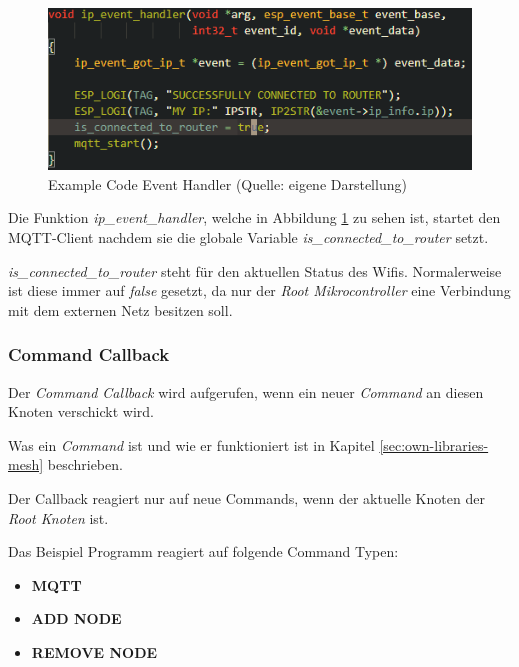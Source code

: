 \begin{figure}[H]
    \begin{center}
        \includegraphics[scale=0.8]{images/example_code_event_handler.png}
        \caption{Example Code Event Handler (Quelle: eigene Darstellung)}
        \label{abb:example_code_event_handler}
    \end{center}
\end{figure}

Die Funktion \textit{ip\_event\_handler}, welche in Abbildung \ref{abb:example_code_event_handler} zu sehen ist, startet den MQTT-Client nachdem sie die globale Variable \textit{is\_connected\_to\_router} setzt.

\textit{is\_connected\_to\_router} steht für den aktuellen Status des Wifis. Normalerweise ist diese immer auf \textit{false} gesetzt, da nur der \textit{Root Mikrocontroller} eine Verbindung mit dem externen Netz besitzen soll.

\subsubsection{Command Callback}

Der \textit{Command Callback} wird aufgerufen, wenn ein neuer \textit{Command} an diesen Knoten verschickt wird.

Was ein \textit{Command} ist und wie er funktioniert ist in Kapitel \ref{sec:own-libraries-mesh} beschrieben.

Der Callback reagiert nur auf neue Commands, wenn der aktuelle Knoten der \textit{Root Knoten} ist.

Das Beispiel Programm reagiert auf folgende Command Typen:

\begin{itemize}
    \item \textbf{MQTT}
    \item \textbf{ADD NODE}
    \item \textbf{REMOVE NODE}
\end{itemize}

